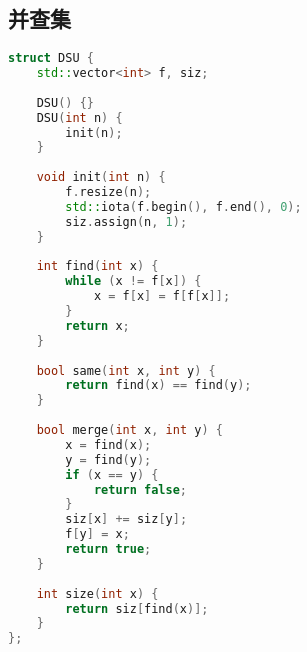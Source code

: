 \subsection{并查集}
\begin{lstlisting}[language=c++]
struct DSU {
    std::vector<int> f, siz;
     
    DSU() {}
    DSU(int n) {
        init(n);
    }
     
    void init(int n) {
        f.resize(n);
        std::iota(f.begin(), f.end(), 0);
        siz.assign(n, 1);
    }
     
    int find(int x) {
        while (x != f[x]) {
            x = f[x] = f[f[x]];
        }
        return x;
    }
     
    bool same(int x, int y) {
        return find(x) == find(y);
    }
     
    bool merge(int x, int y) {
        x = find(x);
        y = find(y);
        if (x == y) {
            return false;
        }
        siz[x] += siz[y];
        f[y] = x;
        return true;
    }
     
    int size(int x) {
        return siz[find(x)];
    }
};
\end{lstlisting}